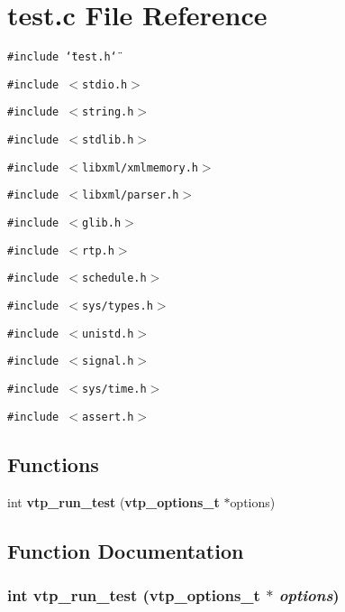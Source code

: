 \section{test.c File Reference}
\label{test_8c}
{\tt \#include \char`\"{}test.h\char`\"{}}\par
{\tt \#include $<$stdio.h$>$}\par
{\tt \#include $<$string.h$>$}\par
{\tt \#include $<$stdlib.h$>$}\par
{\tt \#include $<$libxml/xmlmemory.h$>$}\par
{\tt \#include $<$libxml/parser.h$>$}\par
{\tt \#include $<$glib.h$>$}\par
{\tt \#include $<$rtp.h$>$}\par
{\tt \#include $<$schedule.h$>$}\par
{\tt \#include $<$sys/types.h$>$}\par
{\tt \#include $<$unistd.h$>$}\par
{\tt \#include $<$signal.h$>$}\par
{\tt \#include $<$sys/time.h$>$}\par
{\tt \#include $<$assert.h$>$}\par
\subsection*{Functions}
\begin{CompactItemize}
\item 
int {\bf vtp\_\-run\_\-test} ({\bf vtp\_\-options\_\-t} $\ast$options)
\end{CompactItemize}


\subsection{Function Documentation}
\subsubsection{\setlength{\rightskip}{0pt plus 5cm}int vtp\_\-run\_\-test ({\bf vtp\_\-options\_\-t} $\ast$ {\em options})}\label{test_8c_a0}


